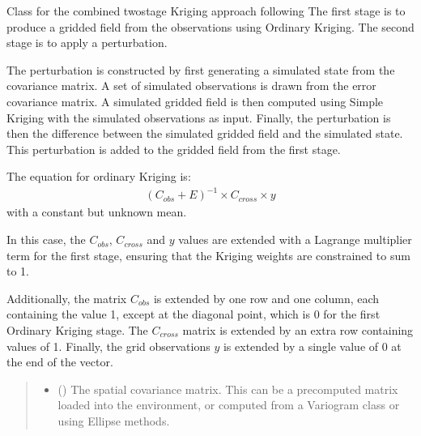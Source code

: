 \documentclass[letterpaper,10pt,english]{sphinxmanual}
\begin{document}
\begin{fulllineitems}
\label{\detokenize{kriging:glomar_gridding.stochastic.StochasticKriging}}
\pysigstartsignatures
\pysiglinewithargsret
{}
{\sphinxparamcomma {}\sphinxparamcomma {}\sphinxparamcomma {}}
{}
\pysigstopsignatures
\sphinxAtStartPar
Class for the combined two\sphinxhyphen{}stage Kriging approach following 
The first stage is to produce a gridded field from the observations using
Ordinary Kriging. The second stage is to apply a perturbation.

\sphinxAtStartPar
The perturbation is constructed by first generating a simulated state from
the covariance matrix. A set of simulated observations is drawn from the
error covariance matrix. A simulated gridded field is then computed using
Simple Kriging with the simulated observations as input. Finally, the
perturbation is then the difference between the simulated gridded field and
the simulated state. This perturbation is added to the gridded field from
the first stage.

\sphinxAtStartPar
The equation for ordinary Kriging is:
\begin{equation*}
\begin{split}(C_{obs} + E)^{-1} \times C_{cross} \times y\end{split}
\end{equation*}
\sphinxAtStartPar
with a constant but unknown mean.

\sphinxAtStartPar
In this case, the \(C_{obs}\), \(C_{cross}\) and \(y\) values
are extended with a Lagrange multiplier term for the first stage, ensuring
that the Kriging weights are constrained to sum to 1.

\sphinxAtStartPar
Additionally, the matrix \(C_{obs}\) is extended by one row and one
column, each containing the value 1, except at the diagonal point, which is
0 for the first Ordinary Kriging stage. The \(C_{cross}\) matrix is
extended by an extra row containing values of 1. Finally, the grid
observations \(y\) is extended by a single value of 0 at the end of the
vector.
\begin{quote}\begin{description}
\begin{itemize}
\item {}
\sphinxAtStartPar
{} () \textendash{} The spatial covariance matrix. This can be a pre\sphinxhyphen{}computed matrix loaded
into the environment, or computed from a Variogram class or using
Ellipse methods.


\end{itemize}
\end{description}
\end{quote}
\end{fulllineitems}
\end{document}
